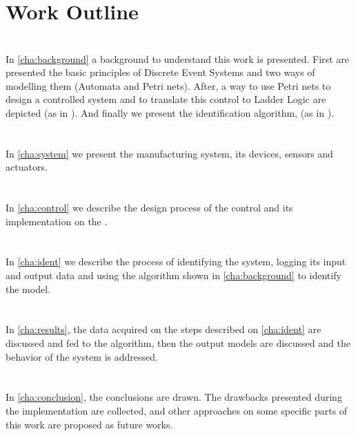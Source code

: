\section{Work Outline}
\label{sec:thesisOutline}

\paragraph{} ~\\
In \autoref{cha:background} a background to understand
this work is presented. First are presented the basic principles of Discrete
Event Systems and two
ways of modelling them (Automata and Petri nets). After, a way to use Petri nets to design
a controlled system and to translate this control to Ladder Logic are depicted (as
in \cite{moreira2013bridging}).
And finally we present the identification algorithm,
\DAOCT{} (as in \cite{moreira2018enhanced}).

\paragraph{} ~\\
In \autoref{cha:system} we present the manufacturing system, its devices, sensors and actuators. 

\paragraph{} ~\\
In \autoref{cha:control} we describe the design process of the control and its
implementation on the \PLCs.

\paragraph{} ~\\
In \autoref{cha:ident} we describe the process of identifying the system,
logging its input and output data and
using the algorithm shown in
\autoref{cha:background} to identify the model.

\paragraph{} ~\\
In \autoref{cha:results}, the data acquired on the steps described on
\autoref{cha:ident} are discussed and fed to the algorithm, then the
output models are discussed and the behavior of the system is addressed.


\paragraph{} ~\\
In \autoref{cha:conclusion}, the conclusions are drawn. The drawbacks presented during the implementation are
collected, and other approaches on some specific parts of this work are proposed
as future works.


